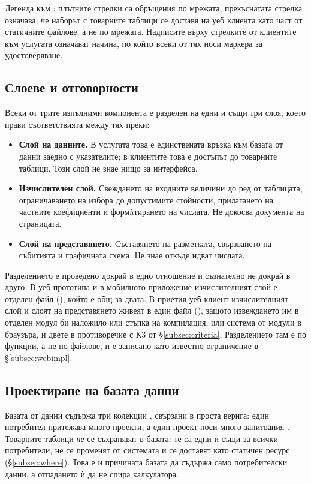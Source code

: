 Легенда към : плътните стрелки са обръщения по мрежата, прекъснатата
стрелка означава, че наборът с товарните таблици се доставя на уеб клиента като част
от статичните файлове, а не по мрежата. Надписите върху стрелките от клиентите към
услугата означават начина, по който всеки от тях носи маркера за удостоверяване.

\subsection{Слоеве и отговорности}
\label{subsec:layers}

Всеки от трите изпълними компонента е разделен на едни и същи три слоя, което прави
съответствията между тях преки:

\begin{itemize}[topsep=2pt,itemsep=2pt,leftmargin=*]
\item \textbf{Слой на данните.} В услугата това е единствената връзка към базата от
      данни заедно с указателите; в клиентите това е достъпът до товарните таблици.
      Този слой не знае нищо за интерфейса.
\item \textbf{Изчислителен слой.} Свеждането на входните величини до ред от таблицата,
      ограничаването на избора до допустимите стойности, прилагането на частните
      коефициенти и формàтирането на числата. Не докосва документа на страницата.
\item \textbf{Слой на представянето.} Съставянето на разметката, свързването на
      събитията и графичната схема. Не знае откъде идват числата.
\end{itemize}

Разделението е проведено докрай в едно отношение и съзнателно не докрай в друго. В
уеб прототипа и в мобилното приложение изчислителният слой е отделен файл
(), който е общ за двата. В приетия уеб клиент изчислителният слой
и слоят на представянето живеят в един файл (), защото извеждането им в
отделен модул би наложило или стъпка на компилация, или система от модули в браузъра,
и двете в противоречие с К3 от §\ref{subsec:criteria}. Разделението там е по
функции, а не по файлове, и е записано като известно ограничение в
§\ref{subsec:webimpl}.

\subsection{Проектиране на базата данни}
\label{subsec:datamodel}

Базата от данни съдържа три колекции , свързани в проста
верига: един потребител притежава много проекти, а един проект носи много запитвания
. Товарните таблици \emph{не} се съхраняват в базата: те са едни и същи
за всички потребители, не се променят от системата и се доставят като статичен ресурс
(§\ref{subsec:where}). Това е и причината базата да съдържа само потребителски данни,
а отпадането ѝ да не спира калкулатора.

